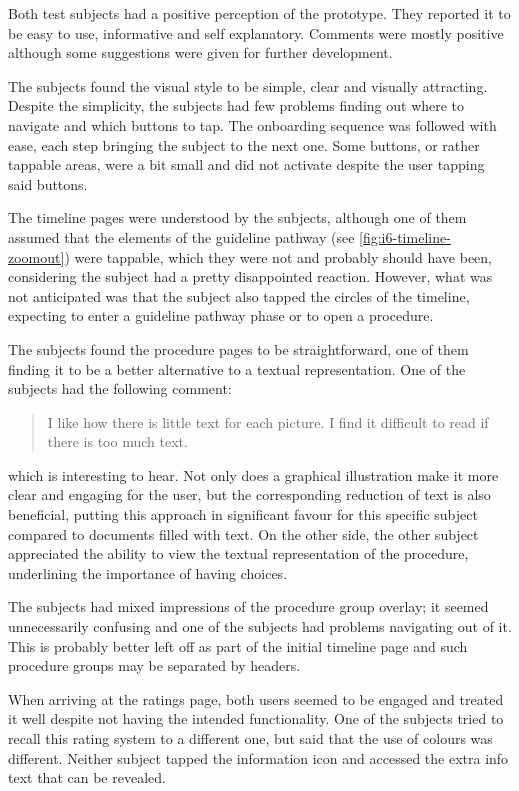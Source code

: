 Both test subjects had a positive perception of the prototype. They reported it to be easy to use, informative and self explanatory. Comments were mostly positive although some suggestions were given for further development.

The subjects found the visual style to be simple, clear and visually attracting. Despite the simplicity, the subjects had few problems finding out where to navigate and which buttons to tap. The onboarding sequence was followed with ease, each step bringing the subject to the next one. Some buttons, or rather tappable areas, were a bit small and did not activate despite the user tapping said buttons.

The timeline pages were understood by the subjects, although one of them assumed that the elements of the guideline pathway (see \autoref{fig:i6-timeline-zoomout}) were tappable, which they were not and probably should have been, considering the subject had a pretty disappointed reaction. However, what was not anticipated was that the subject also tapped the circles of the timeline, expecting to enter a guideline pathway phase or to open a procedure.

The subjects found the procedure pages to be straightforward, one of them finding it to be a better alternative to a textual representation. One of the subjects had the following comment:

\begin{quote}
    I like how there is little text for each picture. I find it difficult to read if there is too much text.
\end{quote}

which is interesting to hear. Not only does a graphical illustration make it more clear and engaging for the user, but the corresponding reduction of text is also beneficial, putting this approach in significant favour for this specific subject compared to documents filled with text. On the other side, the other subject appreciated the ability to view the textual representation of the procedure, underlining the importance of having choices.

The subjects had mixed impressions of the procedure group overlay; it seemed unnecessarily confusing and one of the subjects had problems navigating out of it. This is probably better left off as part of the initial timeline page and such procedure groups may be separated by headers.

When arriving at the ratings page, both users seemed to be engaged and treated it well despite not having the intended functionality. One of the subjects tried to recall this rating system to a different one, but said that the use of colours was different. Neither subject tapped the information icon and accessed the extra info text that can be revealed.

